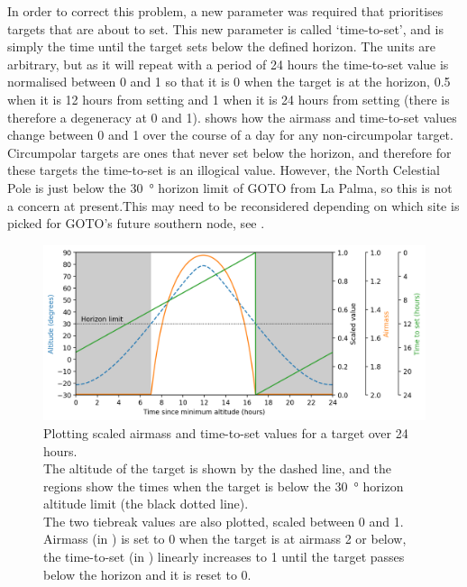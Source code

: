 \begin{colsection}
\begin{colsection}
In order to correct this problem, a new parameter was required that prioritises targets that are about to set. This new parameter is called `time-to-set', and is simply the time until the target sets below the defined horizon. The units are arbitrary, but as it will repeat with a period of 24 hours the time-to-set value is normalised between 0 and 1 so that it is 0 when the target is at the horizon, 0.5 when it is 12 hours from setting and 1 when it is 24 hours from setting (there is therefore a degeneracy at 0 and 1).  shows how the airmass and time-to-set values change between 0 and 1 over the course of a day for any non-circumpolar target. Circumpolar targets are ones that never set below the horizon, and therefore for these targets the time-to-set is an illogical value. However, the North Celestial Pole is just below the \SI{30}{\degree} horizon limit of GOTO from La Palma, so this is not a concern at present.\@ This may need to be reconsidered depending on which site is picked for GOTO's future southern node, see .

\begin{figure}[t]
    \begin{center}
        \includegraphics[width=\linewidth]{images/airmass-tts.png}
    \end{center}
    \caption[Plotting scaled airmass and time-to-set values for a target]{
        Plotting scaled airmass and time-to-set values for a target over 24 hours. \\
        The altitude of the target is shown by the  dashed line, and the  regions show the times when the target is below the \SI{30}{\degree} horizon altitude limit (the black dotted line).\\
        The two tiebreak values are also plotted, scaled between 0 and 1. Airmass (in ) is set to 0 when the target is at airmass 2 or below, the time-to-set (in ) linearly increases to 1 until the target passes below the horizon and it is reset to 0.
    }\label{fig:airmass_tts}
\end{figure}


\end{colsection}
\end{colsection}
